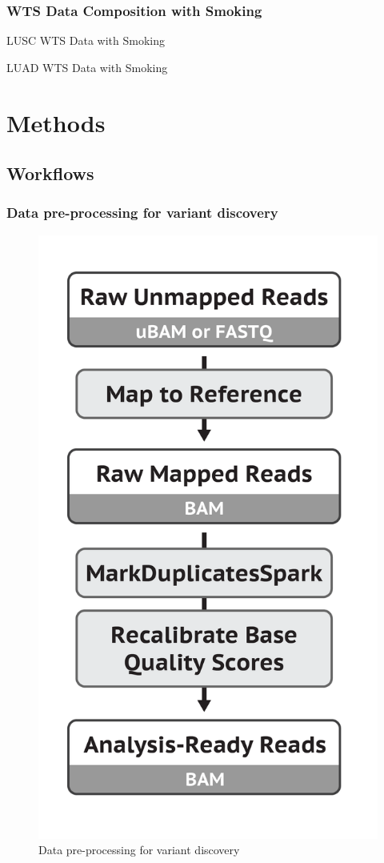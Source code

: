 \documentclass{beamer}
\begin{document}
    \begin{frame}[allowframebreaks]
        \frametitle{WTS Data Composition with Smoking}

        \begin{table}
            \caption{LUSC WTS Data with Smoking}
            \resizebox{!}{0.3 \textheight}
            {}
        \end{table}

        \begin{table}
            \caption{LUAD WTS Data with Smoking}
            \resizebox{!}{0.3 \textheight}
            {}
        \end{table}
    \end{frame}

    \section{Methods}
    \subsection{Workflows}
    \begin{frame}
        \frametitle{Data pre-processing for variant discovery}

        \begin{figure}
            \includegraphics[width=0.3 \linewidth]{figures/Workflow/mapping.png}
            \caption{Data pre-processing for variant discovery \protect\cite{gatk1, gatk2}}
        \end{figure}
    \end{frame}
\end{document}
